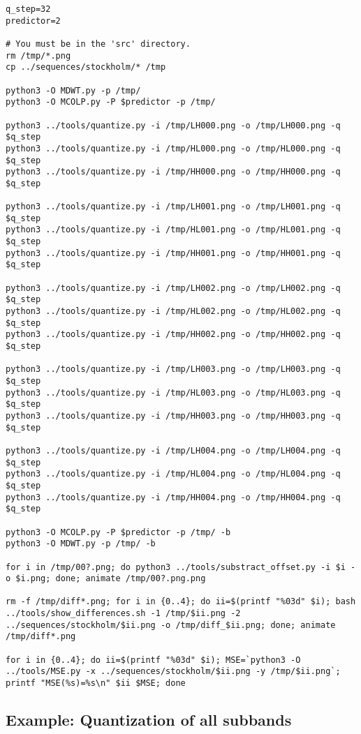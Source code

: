 \begin{verbatim}
q_step=32
predictor=2

# You must be in the 'src' directory.
rm /tmp/*.png
cp ../sequences/stockholm/* /tmp

python3 -O MDWT.py -p /tmp/
python3 -O MCOLP.py -P $predictor -p /tmp/

python3 ../tools/quantize.py -i /tmp/LH000.png -o /tmp/LH000.png -q $q_step
python3 ../tools/quantize.py -i /tmp/HL000.png -o /tmp/HL000.png -q $q_step
python3 ../tools/quantize.py -i /tmp/HH000.png -o /tmp/HH000.png -q $q_step

python3 ../tools/quantize.py -i /tmp/LH001.png -o /tmp/LH001.png -q $q_step
python3 ../tools/quantize.py -i /tmp/HL001.png -o /tmp/HL001.png -q $q_step
python3 ../tools/quantize.py -i /tmp/HH001.png -o /tmp/HH001.png -q $q_step

python3 ../tools/quantize.py -i /tmp/LH002.png -o /tmp/LH002.png -q $q_step
python3 ../tools/quantize.py -i /tmp/HL002.png -o /tmp/HL002.png -q $q_step
python3 ../tools/quantize.py -i /tmp/HH002.png -o /tmp/HH002.png -q $q_step

python3 ../tools/quantize.py -i /tmp/LH003.png -o /tmp/LH003.png -q $q_step
python3 ../tools/quantize.py -i /tmp/HL003.png -o /tmp/HL003.png -q $q_step
python3 ../tools/quantize.py -i /tmp/HH003.png -o /tmp/HH003.png -q $q_step

python3 ../tools/quantize.py -i /tmp/LH004.png -o /tmp/LH004.png -q $q_step
python3 ../tools/quantize.py -i /tmp/HL004.png -o /tmp/HL004.png -q $q_step
python3 ../tools/quantize.py -i /tmp/HH004.png -o /tmp/HH004.png -q $q_step

python3 -O MCOLP.py -P $predictor -p /tmp/ -b
python3 -O MDWT.py -p /tmp/ -b

for i in /tmp/00?.png; do python3 ../tools/substract_offset.py -i $i -o $i.png; done; animate /tmp/00?.png.png

rm -f /tmp/diff*.png; for i in {0..4}; do ii=$(printf "%03d" $i); bash ../tools/show_differences.sh -1 /tmp/$ii.png -2 ../sequences/stockholm/$ii.png -o /tmp/diff_$ii.png; done; animate /tmp/diff*.png

for i in {0..4}; do ii=$(printf "%03d" $i); MSE=`python3 -O ../tools/MSE.py -x ../sequences/stockholm/$ii.png -y /tmp/$ii.png`; printf "MSE(%s)=%s\n" $ii $MSE; done
\end{verbatim}


\subsection*{Example: Quantization of all subbands}

